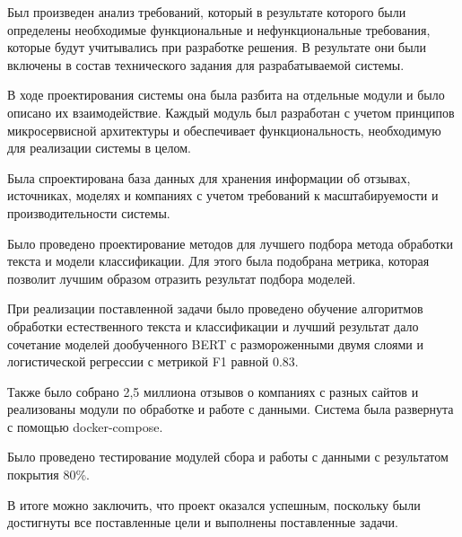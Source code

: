 \documentclass[PI, VKR]{HSEUniversity}
\begin{document}
Был произведен анализ требований, который в результате которого были определены необходимые функциональные и нефункциональные требования, которые будут учитывались при разработке решения. В результате они были включены в состав технического задания для разрабатываемой системы.

В ходе проектирования системы она была разбита на отдельные модули и было описано их взаимодействие. Каждый модуль был разработан с учетом принципов микросервисной архитектуры и обеспечивает функциональность, необходимую для реализации системы в целом.

Была спроектирована база данных для хранения информации об отзывах, источниках, моделях и компаниях  с учетом требований к масштабируемости и производительности системы.

Было проведено проектирование методов для лучшего подбора метода обработки текста и модели классификации. Для этого была подобрана метрика, которая позволит лучшим образом отразить результат подбора моделей.

При реализации поставленной задачи было проведено обучение алгоритмов обработки естественного текста и классификации и лучший результат дало сочетание моделей дообученного BERT с размороженными двумя слоями и логистической регрессии с метрикой F1 равной 0.83.

Также было собрано 2,5 миллиона отзывов о компаниях с разных сайтов и реализованы модули по обработке и работе с данными. Система была развернута с помощью docker-compose.

Было проведено тестирование модулей сбора и работы с данными с результатом покрытия 80\%.

В итоге можно заключить, что проект оказался успешным, поскольку были достигнуты все поставленные цели и выполнены поставленные задачи.

\putbibliography
\appendix

\end{document}
